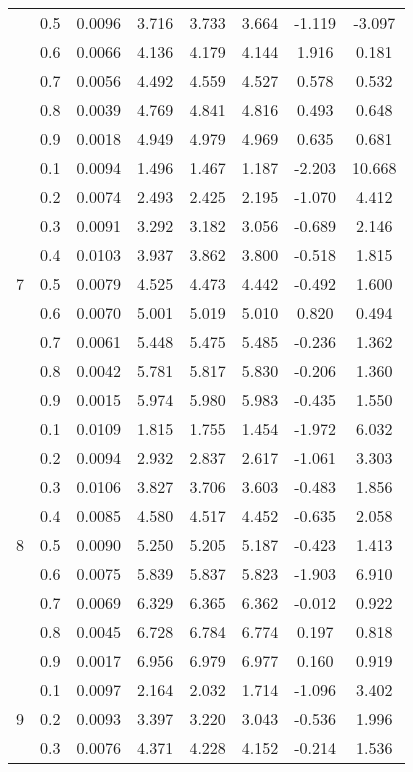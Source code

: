 \documentclass[11pt,a4paper]{report}
\begin{document}
\begin{longtable}{ | c | c || c | c | c | c | c | c | }
 & 0.5 & 0.0096 & 3.716 & 3.733 & 3.664 & -1.119 & -3.097 \\
 & 0.6 & 0.0066 & 4.136 & 4.179 & 4.144 & 1.916 & 0.181 \\
 & 0.7 & 0.0056 & 4.492 & 4.559 & 4.527 & 0.578 & 0.532 \\
 & 0.8 & 0.0039 & 4.769 & 4.841 & 4.816 & 0.493 & 0.648 \\
 & 0.9 & 0.0018 & 4.949 & 4.979 & 4.969 & 0.635 & 0.681 \\
 \hline
\multirow{9}{*}{7} & 0.1 & 0.0094 & 1.496 & 1.467 & 1.187 & -2.203 & 10.668 \\
 & 0.2 & 0.0074 & 2.493 & 2.425 & 2.195 & -1.070 & 4.412 \\
 & 0.3 & 0.0091 & 3.292 & 3.182 & 3.056 & -0.689 & 2.146 \\
 & 0.4 & 0.0103 & 3.937 & 3.862 & 3.800 & -0.518 & 1.815 \\
 & 0.5 & 0.0079 & 4.525 & 4.473 & 4.442 & -0.492 & 1.600 \\
 & 0.6 & 0.0070 & 5.001 & 5.019 & 5.010 & 0.820 & 0.494 \\
 & 0.7 & 0.0061 & 5.448 & 5.475 & 5.485 & -0.236 & 1.362 \\
 & 0.8 & 0.0042 & 5.781 & 5.817 & 5.830 & -0.206 & 1.360 \\
 & 0.9 & 0.0015 & 5.974 & 5.980 & 5.983 & -0.435 & 1.550 \\
 \hline
\multirow{9}{*}{8} & 0.1 & 0.0109 & 1.815 & 1.755 & 1.454 & -1.972 & 6.032 \\
 & 0.2 & 0.0094 & 2.932 & 2.837 & 2.617 & -1.061 & 3.303 \\
 & 0.3 & 0.0106 & 3.827 & 3.706 & 3.603 & -0.483 & 1.856 \\
 & 0.4 & 0.0085 & 4.580 & 4.517 & 4.452 & -0.635 & 2.058 \\
 & 0.5 & 0.0090 & 5.250 & 5.205 & 5.187 & -0.423 & 1.413 \\
 & 0.6 & 0.0075 & 5.839 & 5.837 & 5.823 & -1.903 & 6.910 \\
 & 0.7 & 0.0069 & 6.329 & 6.365 & 6.362 & -0.012 & 0.922 \\
 & 0.8 & 0.0045 & 6.728 & 6.784 & 6.774 & 0.197 & 0.818 \\
 & 0.9 & 0.0017 & 6.956 & 6.979 & 6.977 & 0.160 & 0.919 \\
 \hline
\multirow{9}{*}{9} & 0.1 & 0.0097 & 2.164 & 2.032 & 1.714 & -1.096 & 3.402 \\
 & 0.2 & 0.0093 & 3.397 & 3.220 & 3.043 & -0.536 & 1.996 \\
 & 0.3 & 0.0076 & 4.371 & 4.228 & 4.152 & -0.214 & 1.536 \\

\end{longtable}
\end{document}
